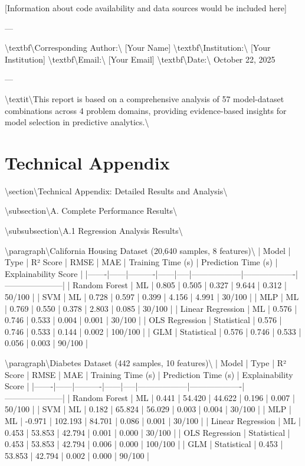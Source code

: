 \documentclass[11pt,a4paper]{article}
\begin{document}
[Information about code availability and data sources would be included here]

---

\textbackslash{}textbf\textbackslash{}{Corresponding Author:\textbackslash{}} [Your Name]  
\textbackslash{}textbf\textbackslash{}{Institution:\textbackslash{}} [Your Institution]  
\textbackslash{}textbf\textbackslash{}{Email:\textbackslash{}} [Your Email]  
\textbackslash{}textbf\textbackslash{}{Date:\textbackslash{}} October 22, 2025

---

\textbackslash{}textit\textbackslash{}{This report is based on a comprehensive analysis of 57 model-dataset combinations across 4 problem domains, providing evidence-based insights for model selection in predictive analytics.\textbackslash{}}


\newpage
\section{Technical Appendix}
\textbackslash{}section\textbackslash{}{Technical Appendix: Detailed Results and Analysis\textbackslash{}}

\textbackslash{}subsection\textbackslash{}{A. Complete Performance Results\textbackslash{}}

\textbackslash{}subsubsection\textbackslash{}{A.1 Regression Analysis Results\textbackslash{}}

\textbackslash{}paragraph\textbackslash{}{California Housing Dataset (20,640 samples, 8 features)\textbackslash{}}
| Model | Type | R² Score | RMSE | MAE | Training Time (s) | Prediction Time (s) | Explainability Score |
|-------|------|----------|------|-----|------------------|-------------------|---------------------|
| Random Forest | ML | 0.805 | 0.505 | 0.327 | 9.644 | 0.312 | 50/100 |
| SVM | ML | 0.728 | 0.597 | 0.399 | 4.156 | 4.991 | 30/100 |
| MLP | ML | 0.769 | 0.550 | 0.378 | 2.803 | 0.085 | 30/100 |
| Linear Regression | ML | 0.576 | 0.746 | 0.533 | 0.004 | 0.001 | 30/100 |
| OLS Regression | Statistical | 0.576 | 0.746 | 0.533 | 0.144 | 0.002 | 100/100 |
| GLM | Statistical | 0.576 | 0.746 | 0.533 | 0.056 | 0.003 | 90/100 |

\textbackslash{}paragraph\textbackslash{}{Diabetes Dataset (442 samples, 10 features)\textbackslash{}}
| Model | Type | R² Score | RMSE | MAE | Training Time (s) | Prediction Time (s) | Explainability Score |
|-------|------|----------|------|-----|------------------|-------------------|---------------------|
| Random Forest | ML | 0.441 | 54.420 | 44.622 | 0.196 | 0.007 | 50/100 |
| SVM | ML | 0.182 | 65.824 | 56.029 | 0.003 | 0.004 | 30/100 |
| MLP | ML | -0.971 | 102.193 | 84.701 | 0.086 | 0.001 | 30/100 |
| Linear Regression | ML | 0.453 | 53.853 | 42.794 | 0.001 | 0.000 | 30/100 |
| OLS Regression | Statistical | 0.453 | 53.853 | 42.794 | 0.006 | 0.000 | 100/100 |
| GLM | Statistical | 0.453 | 53.853 | 42.794 | 0.002 | 0.000 | 90/100 |
\end{document}
